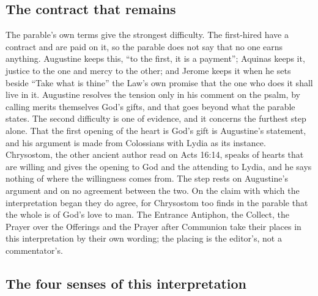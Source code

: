 \subsection{The contract that remains}

The parable's own terms give the strongest difficulty. The first-hired have
a contract and are paid on it, so the parable does not say that no one earns
anything. Augustine keeps this, ``to the first, it is a payment''; Aquinas
keeps it, justice to the one and mercy to the other; and Jerome keeps it when
he sets beside ``Take what is thine'' the Law's own promise that the one who
does it shall live in it. Augustine resolves the tension only in his comment
on the psalm, by calling merits themselves God's gifts, and that goes beyond
what the parable states. The second difficulty is one of evidence, and it
concerns the furthest step alone. That the first opening of the heart is God's gift is Augustine's
statement, and his argument is made from Colossians with Lydia as its
instance. Chrysostom, the other ancient author read on Acts
16:14, speaks of hearts that are willing and gives the opening to God and the
attending to Lydia, and he says nothing of where the willingness comes from.
The step rests on Augustine's argument and on no agreement between the two. On
the claim with which the interpretation began they do agree, for Chrysostom
too finds in the parable that the whole is of God's love to man. The
Entrance Antiphon, the Collect, the Prayer over the Offerings and the Prayer
after Communion take their places in this interpretation by their own
wording; the placing is the editor's, not a commentator's.

\subsection{The four senses of this interpretation}

